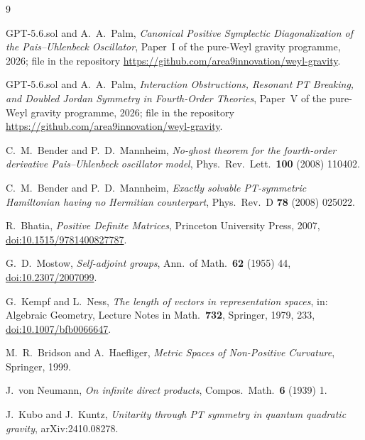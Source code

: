 \documentclass[11pt]{article}
\theoremstyle{definition}
\theoremstyle{remark}
\begin{document}
\begin{thebibliography}{9}

GPT-5.6.sol and A.~A.~Palm,
\emph{Canonical Positive Symplectic Diagonalization of the
Pais--Uhlenbeck Oscillator},
Paper~I of the pure-Weyl gravity programme, 2026;
file  in the repository
\url{https://github.com/area9innovation/weyl-gravity}.

GPT-5.6.sol and A.~A.~Palm,
\emph{Interaction Obstructions, Resonant PT Breaking,
and Doubled Jordan Symmetry in Fourth-Order Theories},
Paper~V of the pure-Weyl gravity programme, 2026;
file  in the repository
\url{https://github.com/area9innovation/weyl-gravity}.

C.~M.~Bender and P.~D.~Mannheim,
\emph{No-ghost theorem for the fourth-order derivative Pais--Uhlenbeck
oscillator model},
Phys.\ Rev.\ Lett.\ \textbf{100} (2008) 110402.

C.~M.~Bender and P.~D.~Mannheim,
\emph{Exactly solvable PT-symmetric Hamiltonian having no Hermitian
counterpart},
Phys.\ Rev.\ D \textbf{78} (2008) 025022.

R.~Bhatia, \emph{Positive Definite Matrices}, Princeton University Press,
2007,
\href{https://doi.org/10.1515/9781400827787}{doi:10.1515/9781400827787}.

G.~D.~Mostow,
\emph{Self-adjoint groups},
Ann.\ of Math.\ \textbf{62} (1955) 44,
\href{https://doi.org/10.2307/2007099}{doi:10.2307/2007099}.

G.~Kempf and L.~Ness,
\emph{The length of vectors in representation spaces},
in: Algebraic Geometry, Lecture Notes in Math.\ \textbf{732}, Springer,
1979, 233,
\href{https://doi.org/10.1007/bfb0066647}{doi:10.1007/bfb0066647}.

M.~R.~Bridson and A.~Haefliger,
\emph{Metric Spaces of Non-Positive Curvature},
Springer, 1999.

J.~von Neumann,
\emph{On infinite direct products},
Compos.\ Math.\ \textbf{6} (1939) 1.

J.~Kubo and J.~Kuntz,
\emph{Unitarity through PT symmetry in quantum quadratic gravity},
arXiv:2410.08278.

\end{thebibliography}
\end{document}
